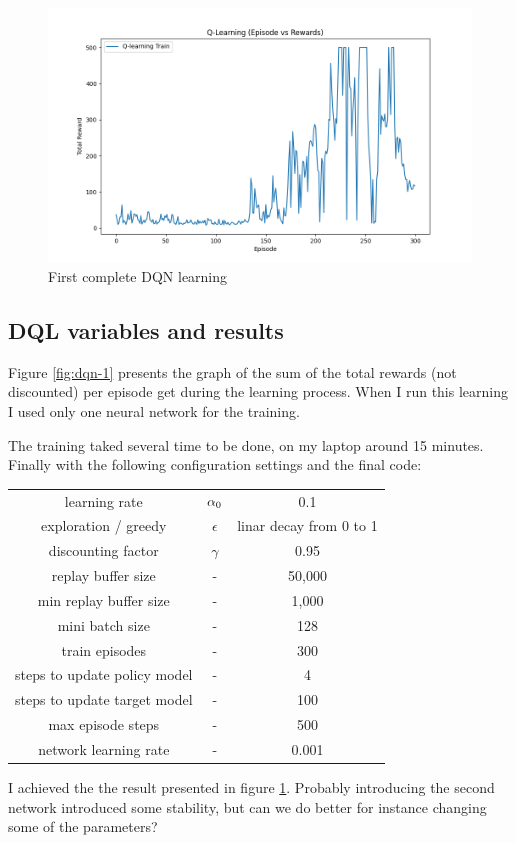 \documentclass{article}
\begin{document}
\begin{figure}
  \includegraphics[width=\linewidth]{DQN-0002.png}
  \caption{First complete DQN learning}
  \label{fig:dqn-2}
\end{figure}

\subsection{DQL variables and results}

Figure \ref{fig:dqn-1} presents the graph of the sum of the total rewards (not discounted) per episode get during 
the learning process. When I run this learning I used only one neural network for the training.

The training taked several time to be done, on my laptop around 15 minutes.
Finally with the following configuration settings and the final code:

\begin{tabular}{ c c c }
  learning rate & $\alpha\textsubscript{0}$ & 0.1 \\
  exploration / greedy & $\epsilon$ & linar decay from 0 to 1 \\
  discounting factor & $\gamma$ & 0.95 \\  
  replay buffer size & - & 50,000 \\
  min replay buffer size & - & 1,000 \\
  mini batch size & - & 128 \\
  train episodes & - & 300 \\
  steps to update policy model & - & 4 \\
  steps to update target model & - & 100  \\
  max episode steps & - & 500 \\
  network learning rate & - & 0.001
\end{tabular}

I achieved the the result presented in figure \ref{fig:dqn-2}.
Probably introducing the second network introduced some stability,
but can we do better for instance changing some of the parameters?
\end{document}
